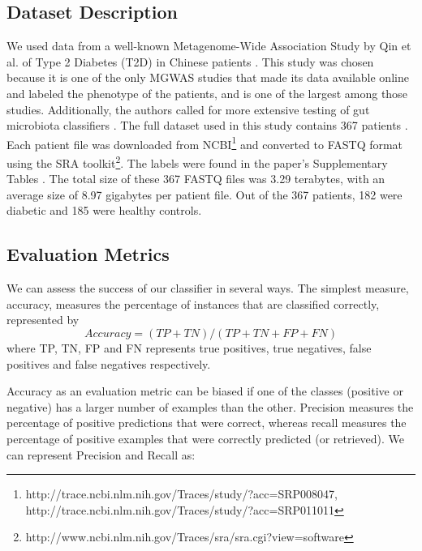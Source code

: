 \subsection{Dataset Description}

We used data from a well-known Metagenome-Wide Association Study by Qin et al. of Type 2 Diabetes (T2D) in Chinese patients \cite{qin041012}. This study was chosen because it is one of the only MGWAS studies that made its data available online and labeled the phenotype of the patients, and is one of the largest among those studies. Additionally, the authors called for more extensive testing of gut microbiota classifiers \cite{qin041012}. The full dataset used in this study contains 367 patients \cite{qin041012}. Each patient file was downloaded from NCBI\footnote{http://trace.ncbi.nlm.nih.gov/Traces/study/?acc=SRP008047, http://trace.ncbi.nlm.nih.gov/Traces/study/?acc=SRP011011}
and converted to FASTQ format using the SRA toolkit\footnote{http://www.ncbi.nlm.nih.gov/Traces/sra/sra.cgi?view=software}.
The labels were found in the paper's Supplementary Tables \cite{qin041012}. The total size of these 367 FASTQ files was 3.29 terabytes, with an average size of 8.97 gigabytes per patient file. Out of the 367 patients, 182 were diabetic and 185 were healthy controls. 

\subsection{Evaluation Metrics}

We can assess the success of our classifier in several ways. The simplest measure, accuracy, measures the percentage of instances 
that are classified correctly, represented by 
\begin{equation}
Accuracy = (TP + TN)/ (TP + TN + FP + FN)  \label{eqn:acc} 
\end{equation}
where TP, TN, FP and FN represents true positives, true negatives, false positives and false negatives respectively.

Accuracy as an evaluation metric can be biased if one of the classes 
(positive or negative)  has a larger number of examples than the other.   
Precision measures the percentage of positive predictions that 
were correct, 
whereas recall measures the percentage of positive 
examples that were correctly predicted (or retrieved). 
We can represent Precision and Recall as:

